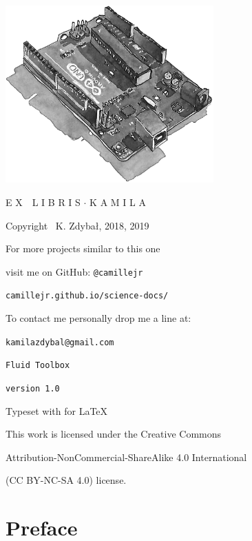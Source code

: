 \documentclass[10pt]{report}
\begin{document}
\thispagestyle{empty}
\begin{center}
\vspace*{3cm}
\includegraphics[width = 80mm]{ex_libris_arduino.jpg}

\vspace*{1cm}

{\fontsize{18}{10}\selectfont {}\selectfont E X \,\, L I B R I S $\cdotp$ K A M I L A}

\vspace*{2cm}

Copyright \textcopyright \, K. Zdybał, 2018, 2019

For more projects similar to this one

visit me on GitHub: \verb|@camillejr|

\verb|camillejr.github.io/science-docs/|

To contact me personally drop me a line at:

\verb|kamilazdybal@gmail.com|

\vspace*{2cm}

\verb|Fluid Toolbox|

\verb|version 1.0|

Typeset with  for \LaTeX

\vspace*{1.8cm}

\noindent This work is licensed under the Creative Commons

Attribution-NonCommercial-ShareAlike 4.0 International 

(CC BY-NC-SA
4.0) license.
\end{center}

\setlength{\parskip}{0.6em}
\setlength{\parindent}{0cm}

\tableofcontents
\chapter*{Preface}
\thispagestyle{empty}
\end{document}
